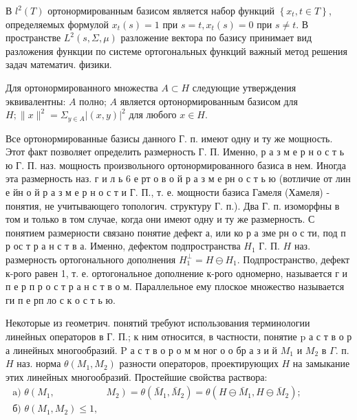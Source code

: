 \documentclass[10pt]{article}
\begin{document}
В $l^{2}(T)$ ортонормированным базисом является набор функций $\left\{x_{t}, t \in T\right\}$, определяемых формулой $x_{t}(s)=1$ при $s=t, x_{t}(s)=0$ при $s \neq t$. В пространстве $L^{2}(s, \Sigma, \mu)$ разложение вектора по базису принимает вид разложения функции по системе ортогональных функций важный метод решения задач математич. физики.



Для ортонормированного множества $A \subset H$ следующие утверждения эквивалентны: $A$ полно; $A$ является ортонормированным базисом для $H ;\|x\|^{2}=\Sigma_{y \in A}|(x, y)|^{2}$ для любого $x \in H$.



Все ортонормированные базисы данного Г. п. имеют одну и ту же мощность. Этот факт позволяет определить размерность Г. П. Именно, р а з м е р н о с т ь ю Г. П. наз. мощность произвольного ортонормированного базиса в нем. Иногда эта размерность наз. г и л ь 6 е рт о в о й р а з м е рн о с т ь ю (вотличие от лин е йн о й р а з м е р н о с т и Г. П., т. е. мощности базиса Гамеля (Хамеля) - понятия, не учитывающего топологич. структуру Г. п.). Два Г. п. изоморфны в том и только в том случае, когда они имеют одну и ту же размерность. С понятием размерности связано понятие дефект а, или ко р а зме рн о с ти, под п р ос т р а н с т в а. Именно, дефектом подпространства $H_{1}$ Г. П. $H$ наз. размерность ортогонального дополнения $H_{1}^{\perp}=H \ominus H_{1}$. Подпространство, дефект к-рого равен 1, т. е. ортогональное дополнение к-рого одномерно, называется г и п е р п р о с т р а н с т в о м. Параллельное ему плоское множество называется ги п е рп ло с к о с т ь ю.



Некоторые из геометрич. понятий требуют использования терминологии линейных операторов в Г. П.; к ним относится, в частности, понятие $\mathrm{p}$ а с т в о р а линейных многообразий. $\mathrm{P}$ а с т в о р о м м ног о о бр а з и й $M_{1}$ и $M_{2}$ в $\Gamma$. п. $H$ наз. норма $\theta\left(M_{1}, M_{2}\right)$ разности операторов, проектирующих $H$ на замыкание этих линейных многообразий. Простейшие свойства раствора: $\begin{array}{ll}\text { a) } \theta\left(M_{1},\right. & \left.M_{2}\right)=\theta\left(\bar{M}_{1}, \bar{M}_{2}\right)=\theta\left(H \ominus \bar{M}_{1}, H \ominus \bar{M}_{2}\right) \text {; } \\ \text { б) } \theta\left(M_{1}, M_{2}\right) \leqslant 1,\end{array}$
\end{document}
